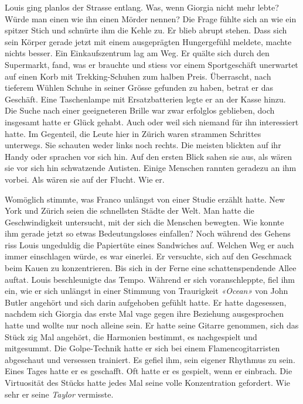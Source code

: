 \sectionbreak

Louis ging planlos der Strasse entlang. Was, wenn Giorgia nicht mehr lebte? Würde man einen wie ihn einen Mörder nennen?
Die Frage fühlte sich an wie ein spitzer Stich und schnürte ihm die Kehle zu. Er blieb abrupt stehen. 
Dass sich sein Körper gerade jetzt mit einem ausgeprägten Hungergefühl meldete, machte nichts besser. 
Ein Einkaufszentrum lag am Weg. Er quälte sich durch den Supermarkt, fand, was er brauchte und stiess vor einem Sportgeschäft unerwartet auf einen Korb mit Trekking-Schuhen zum halben Preis. Überrascht, nach tieferem Wühlen Schuhe in seiner Grösse gefunden zu haben, betrat er das Geschäft.
Eine Taschenlampe mit Ersatzbatterien legte er an der Kasse hinzu. Die Suche nach einer geeigneteren Brille war zwar erfolglos geblieben, doch insgesamt hatte er Glück gehabt. Auch oder weil sich niemand für ihn interessiert hatte. Im Gegenteil, die Leute hier in Zürich waren strammen Schrittes unterwegs. Sie schauten weder links noch rechts.
Die meisten blickten auf ihr Handy oder sprachen vor sich hin. Auf den ersten Blick sahen sie aus, als wären
sie vor sich hin schwatzende Autisten. Einige Menschen rannten geradezu
an ihm vorbei. Als wären sie auf der Flucht. Wie er.

Womöglich stimmte, was Franco unlängst von einer Studie erzählt hatte. 
New York und Zürich seien die schnellsten Städte der Welt. Man
hatte die Geschwindigkeit untersucht, mit der sich die Menschen
bewegten. Wie konnte ihm gerade jetzt so etwas Bedeutungsloses einfallen? 
Noch während des Gehens riss Louis ungeduldig die Papiertüte eines Sandwiches auf.
Welchen Weg er auch immer einschlagen würde, es war einerlei. Er 
versuchte, sich auf den Geschmack beim Kauen zu konzentrieren. Bis sich in der Ferne eine schattenspendende Allee auftat. Louis beschleunigte das Tempo. Während er sich voranschleppte, fiel ihm ein, wie er
sich unlängst in einer Stimmung von Traurigkeit \emph{«Ocean»} von
John Butler angehört und sich darin aufgehoben gefühlt hatte.
Er hatte dagesessen, nachdem sich Giorgia das erste Mal vage gegen
ihre Beziehung ausgesprochen hatte und wollte nur noch alleine sein. Er
hatte seine Gitarre genommen, sich das Stück zig Mal angehört, die
Harmonien bestimmt, es nachgespielt und mitgesummt. 
Die  Golpe-Technik hatte er sich bei einem Flamencogitarristen abgeschaut und versessen trainiert. Es gefiel ihm, sein eigener Rhythmus zu sein. Eines Tages hatte er es geschafft. Oft hatte er es gespielt, wenn er einbrach.
Die Virtuosität des Stücks hatte jedes Mal seine volle Konzentration gefordert. 
Wie sehr er seine \emph{Taylor}  vermisste. 

